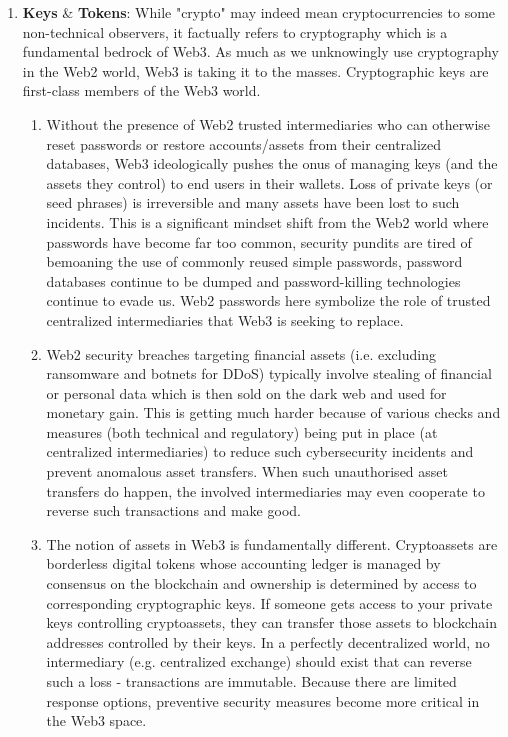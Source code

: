 \begin{enumerate}
\item\textbf{Keys} \& \textbf{Tokens}: While "crypto" may indeed mean cryptocurrencies to some non-technical observers, it factually refers to cryptography which is a fundamental bedrock of Web3. As much as we unknowingly use cryptography in the Web2 world, Web3 is taking it to the masses. Cryptographic keys are first-class members of the Web3 world.
\begin{enumerate}
\item Without the presence of Web2 trusted intermediaries who can otherwise reset passwords or restore accounts/assets from their centralized databases, Web3 ideologically pushes the onus of managing keys (and the assets they control) to end users in their wallets. Loss of private keys (or seed phrases) is irreversible and many assets have been lost to such incidents. This is a significant mindset shift from the Web2 world where passwords have become far too common, security pundits are tired of bemoaning the use of commonly reused simple passwords, password databases continue to be dumped and password-killing technologies continue to evade us. Web2 passwords here symbolize the role of trusted centralized intermediaries that Web3 is seeking to replace.
\item Web2 security breaches targeting financial assets (i.e. excluding ransomware and botnets for DDoS) typically involve stealing of financial or personal data which is then sold on the dark web and used for monetary gain. This is getting much harder because of various checks and measures (both technical and regulatory) being put in place (at centralized intermediaries) to reduce such cybersecurity incidents and prevent anomalous asset transfers. When such unauthorised asset transfers do happen, the involved intermediaries may even cooperate to reverse such transactions and make good.
\item The notion of assets in Web3 is fundamentally different. Cryptoassets are borderless digital tokens whose accounting ledger is managed by consensus on the blockchain and ownership is determined by access to corresponding cryptographic keys. If someone gets access to your private keys controlling cryptoassets, they can transfer those assets to blockchain addresses controlled by their keys. In a perfectly decentralized world, no intermediary (e.g. centralized exchange) should exist that can reverse such a loss - transactions are immutable. Because there are limited response options, preventive security measures become more critical in the Web3 space.
\end{enumerate}


\end{enumerate}
